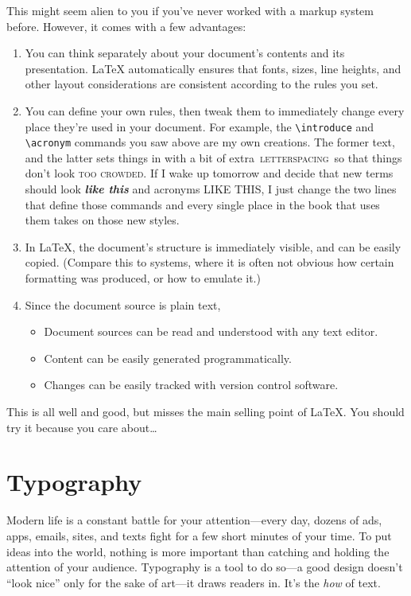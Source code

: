 This might seem alien to you if you've never worked with a markup system before.
However, it comes with a few advantages:
\begin{enumerate}
\item You can think separately about your document's contents and
    its presentation.
    \LaTeX{} automatically ensures that fonts, sizes, line heights,
    and other layout considerations are consistent according to the rules you set.
\item You can define your own rules, then tweak them to immediately change
    every place they're used in your document.
    For example, the \verb|\introduce| and \verb|\acronym| commands you saw above
    are my own creations. The former  text, and
    the latter sets things in  with a bit of extra
    \,\textsc{letterspacing}\, so that things don't
    look \textsc{too crowded}.
    If I wake up tomorrow and decide that new terms should look
    \textbf{\itshape like this} and acronyms
    {\small{} LIKE THIS},
    I just change the two lines that define those commands
    and every single place in the book that uses them takes on those new styles.
\item In \LaTeX, the document's structure is immediately visible,
    and can be easily copied.
    (Compare this to  systems, where it is often not obvious
    how certain formatting was produced,
    or how to emulate it.)
\item Since the document source is plain text,
    \begin{itemize}
    \item Document sources can be read and understood with any text editor.
    \item Content can be easily generated programmatically.
    \item Changes can be easily tracked with version control software.
    \end{itemize}
\end{enumerate}

This is all well and good,
but misses the main selling point of \LaTeX.
You should try it because you care about\ldots

\chapter{Typography}
\label{typography}

Modern life is a constant battle for your attention---every day,
dozens of ads, apps, emails, sites, and texts fight
for a few short minutes of your time.
To put ideas into the world,
nothing is more important than catching and holding
the attention of your audience.
Typography is a tool to do so---a good design doesn't ``look nice''
only for the sake of art---it draws readers in.\punckern{}
It's the \emph{how} of text.

